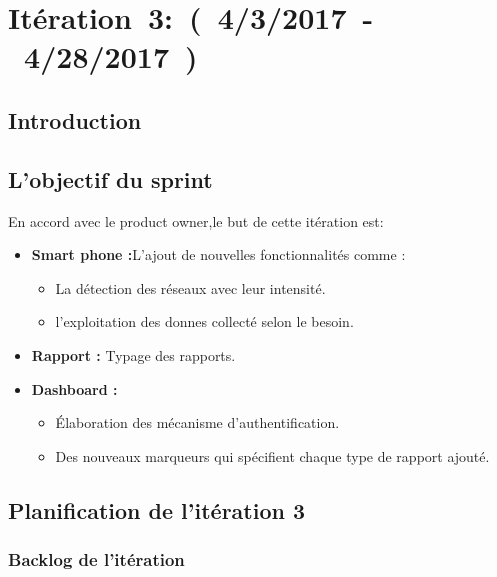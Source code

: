 \section{Itération~3:~(~4/3/2017~-~4/28/2017~)}
\subsection{Introduction}
\subsection{L'objectif du sprint}
En accord avec le product owner,le but de cette itération est:
\begin{itemize}
 \item \textbf{Smart phone :}L’ajout de nouvelles fonctionnalités comme :
        \begin{itemize}
         \item La détection des réseaux avec leur intensité.
         \item l'exploitation des donnes collecté selon le besoin.
        \end{itemize}
\item \textbf{Rapport :} Typage des rapports.
\item \textbf{Dashboard :}
        \begin{itemize}
         \item Élaboration des mécanisme d'authentification.
         \item Des nouveaux marqueurs qui spécifient chaque type de rapport ajouté.
        \end{itemize}

\end{itemize}


\subsection{Planification de l'itération 3}

\subsubsection{Backlog de l'itération}

